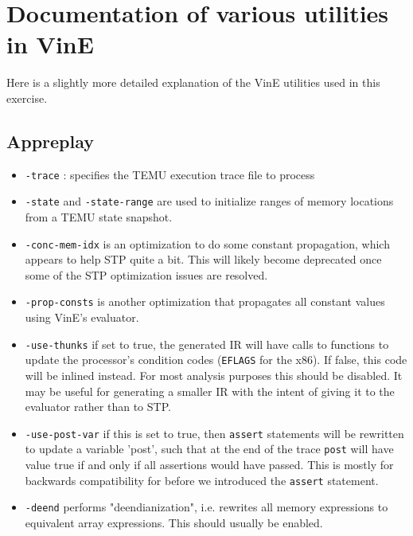 \section {Documentation of various utilities in VinE}
\label{sec:utils}

Here is a slightly more detailed explanation of the VinE utilities
used in this exercise.

\subsection {Appreplay}

\begin{itemize}

\item \texttt{-trace} : specifies the TEMU execution trace file to process

\item \texttt {-state} and \texttt{-state-range} are used to
initialize ranges of memory locations from a TEMU state snapshot.

\item \texttt{-conc-mem-idx} is an optimization to do some constant
propagation, which appears to help STP quite a bit. This will likely
become deprecated once some of the STP optimization issues are
resolved.

\item \texttt{-prop-consts} is another optimization that propagates
all constant values using VinE's evaluator.

\item \texttt {-use-thunks} if set to true, the generated IR will
have calls to functions to update the processor's condition codes
(\verb'EFLAGS' for the x86). If false, this code will be inlined
instead.  For most analysis purposes this should be disabled. It may
be useful for generating a smaller IR with the intent of giving it to
the evaluator rather than to STP.

\item \texttt{-use-post-var} if this is  set to true, then
\verb'assert' statements will be rewritten to update a variable
'post', such that at the end of the trace \verb'post' will have value
true if and only if all assertions would have passed.  This is mostly
for backwards compatibility for before we introduced the \verb'assert'
statement.

\item \texttt  {-deend} performs "deendianization",  i.e. rewrites
all memory expressions to equivalent array expressions. This should
usually be enabled.


\end{itemize}

